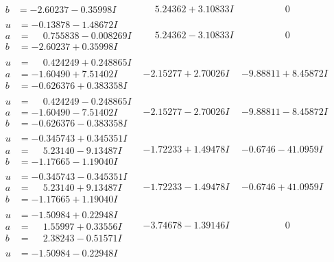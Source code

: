 \documentclass[1p]{elsarticle_modified}
\theoremstyle{definition}
\begin{document}
$$\begin{array}{c|c|c}
\begin{aligned}
b &= -2.60237 - 0.35998 I\end{aligned}
 & \phantom{-}5.24362 + 3.10833 I & \phantom{-0.000000 } 0 \\ \hline\begin{aligned}
u &= -0.13878 - 1.48672 I \\
a &= \phantom{-}0.755838 - 0.008269 I \\
b &= -2.60237 + 0.35998 I\end{aligned}
 & \phantom{-}5.24362 - 3.10833 I & \phantom{-0.000000 } 0 \\ \hline\begin{aligned}
u &= \phantom{-}0.424249 + 0.248865 I \\
a &= -1.60490 + 7.51402 I \\
b &= -0.626376 + 0.383358 I\end{aligned}
 & -2.15277 + 2.70026 I & -9.88811 + 8.45872 I \\ \hline\begin{aligned}
u &= \phantom{-}0.424249 - 0.248865 I \\
a &= -1.60490 - 7.51402 I \\
b &= -0.626376 - 0.383358 I\end{aligned}
 & -2.15277 - 2.70026 I & -9.88811 - 8.45872 I \\ \hline\begin{aligned}
u &= -0.345743 + 0.345351 I \\
a &= \phantom{-}5.23140 - 9.13487 I \\
b &= -1.17665 - 1.19040 I\end{aligned}
 & -1.72233 + 1.49478 I & -0.6746 - 41.0959 I \\ \hline\begin{aligned}
u &= -0.345743 - 0.345351 I \\
a &= \phantom{-}5.23140 + 9.13487 I \\
b &= -1.17665 + 1.19040 I\end{aligned}
 & -1.72233 - 1.49478 I & -0.6746 + 41.0959 I \\ \hline\begin{aligned}
u &= -1.50984 + 0.22948 I \\
a &= \phantom{-}1.55997 + 0.33556 I \\
b &= \phantom{-}2.38243 - 0.51571 I\end{aligned}
 & -3.74678 - 1.39146 I & \phantom{-0.000000 } 0 \\ \hline\begin{aligned}
u &= -1.50984 - 0.22948 I \\

\end{aligned}
\end{array}$$
\end{document}
